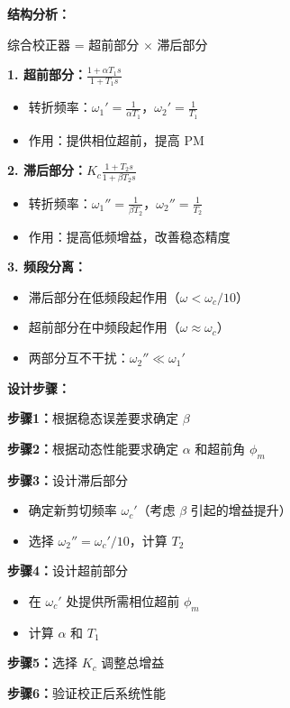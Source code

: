 \begin{minipage}[t]{0.52\textwidth}
\textbf{结构分析：}

综合校正器 = 超前部分 $\times$ 滞后部分

\textbf{1. 超前部分：}$\frac{1 + \alpha T_1 s}{1 + T_1 s}$
\begin{itemize}
    \item 转折频率：$\omega_1' = \frac{1}{\alpha T_1}$，$\omega_2' = \frac{1}{T_1}$
    \item 作用：提供相位超前，提高 PM
\end{itemize}

\textbf{2. 滞后部分：}$K_c \frac{1 + T_2 s}{1 + \beta T_2 s}$
\begin{itemize}
    \item 转折频率：$\omega_1'' = \frac{1}{\beta T_2}$，$\omega_2'' = \frac{1}{T_2}$
    \item 作用：提高低频增益，改善稳态精度
\end{itemize}

\textbf{3. 频段分离：}
\begin{itemize}
    \item 滞后部分在低频段起作用（$\omega < \omega_c/10$）
    \item 超前部分在中频段起作用（$\omega \approx \omega_c$）
    \item 两部分互不干扰：$\omega_2'' \ll \omega_1'$
\end{itemize}

\vspace{0.3cm}
\textbf{设计步骤：}

\textbf{步骤1：}根据稳态误差要求确定 $\beta$

\textbf{步骤2：}根据动态性能要求确定 $\alpha$ 和超前角 $\phi_m$

\textbf{步骤3：}设计滞后部分
\begin{itemize}
    \item 确定新剪切频率 $\omega_c'$（考虑 $\beta$ 引起的增益提升）
    \item 选择 $\omega_2'' = \omega_c'/10$，计算 $T_2$
\end{itemize}

\textbf{步骤4：}设计超前部分
\begin{itemize}
    \item 在 $\omega_c'$ 处提供所需相位超前 $\phi_m$
    \item 计算 $\alpha$ 和 $T_1$
\end{itemize}

\textbf{步骤5：}选择 $K_c$ 调整总增益

\textbf{步骤6：}验证校正后系统性能

\end{minipage}\hfill
